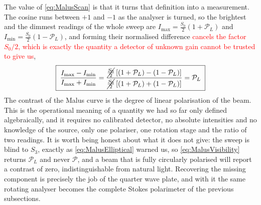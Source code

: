             The value of \ref{eq:MalusScan} is that it turns that definition into a measurement. The cosine runs between $+1$ and $-1$ as the analyser is turned, so the brightest and the dimmest readings of the whole sweep are $I_{\max}=\frac{S_0}{2}\left(1+\mathcal{P}_L\right)$ and $I_{\min}=\frac{S_0}{2}\left(1-\mathcal{P}_L\right)$, and forming their normalised difference \textcolor{red}{cancels the factor $S_0/2$, which is exactly the quantity a detector of unknown gain cannot be trusted to give us},
            \begin{equation}\label{eq:MalusVisibility}
                \boxed{\;\frac{I_{\max}-I_{\min}}{I_{\max}+I_{\min}} = \frac{\cancel{\frac{S_0}{2}}\left[\left(1+\mathcal{P}_L\right)-\left(1-\mathcal{P}_L\right)\right]}{\cancel{\frac{S_0}{2}}\left[\left(1+\mathcal{P}_L\right)+\left(1-\mathcal{P}_L\right)\right]} = \mathcal{P}_L\;}
            \end{equation}
            The contrast of the Malus curve is the degree of linear polarisation of the beam. This is the operational meaning of a quantity we had so far only defined algebraically, and it requires no calibrated detector, no absolute intensities and no knowledge of the source, only one polariser, one rotation stage and the ratio of two readings. It is worth being honest about what it does not give: the sweep is blind to $S_3$, exactly as \ref{eq:MalusElliptical} warned us, so \ref{eq:MalusVisibility} returns $\mathcal{P}_L$ and never $\mathcal{P}$, and a beam that is fully circularly polarised will report a contrast of zero, indistinguishable from natural light. Recovering the missing component is precisely the job of the quarter wave plate, and with it the same rotating analyser becomes the complete Stokes polarimeter of the previous subsections.

